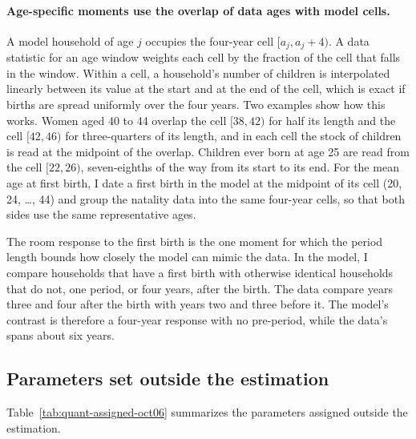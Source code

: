 \paragraph{Age-specific moments use the overlap of data ages with model cells.}
A model household of age $j$ occupies the four-year cell $[a_j,a_j+4)$. A data
statistic for an age window weights each cell by the fraction of the cell that
falls in the window. Within a cell, a household's number of children is
interpolated linearly between its value at the start and at the end of the
cell, which is exact if births are spread uniformly over the four years. Two
examples show how this works. Women aged 40 to 44 overlap the cell
$[38,42)$ for half its length and the cell $[42,46)$ for three-quarters of its
length, and in each cell the stock of children is read at the midpoint of the
overlap. Children ever born at age 25 are read from the cell $[22,26)$,
seven-eighths of the way from its start to its end. For the mean age at first
birth, I date a first birth in the model at the midpoint of its cell (20, 24,
\ldots, 44) and group the natality data into the same four-year cells, so that
both sides use the same representative ages.

The room response to the first birth is the one moment for which the period
length bounds how closely the model can mimic the data. In the model, I
compare households that have a first birth with otherwise identical
households that do not, one period, or four years, after the birth. The data
compare years three and four after the birth with years two and three before
it. The model's contrast is therefore a four-year response with no
pre-period, while the data's spans about six years.

\subsection{Parameters set outside the estimation}

Table~\ref{tab:quant-assigned-oct06} summarizes the parameters assigned
outside the estimation.

